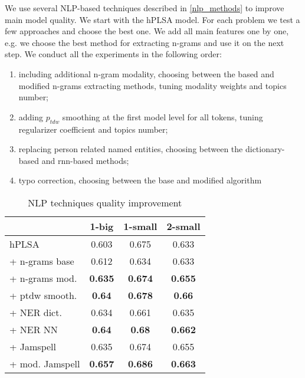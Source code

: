 
We use several NLP-based techniques described in \ref{nlp_methods} to improve main model quality.
We start with the hPLSA model.
For each problem we test a few approaches and choose the best one. 
We add all main features one by one, e.g. we choose the best method for extracting n-grams and use it on the next step.
We conduct all the experiments in the following order:
\begin{enumerate}
    \item including additional n-gram modality, choosing between the based and modified n-grams extracting methods, tuning modality weights and topics number;
    \item adding $p_{tdw}$ smoothing at the first model level for all tokens, tuning regularizer coefficient and topics number;
    \item replacing person related named entities, choosing between the dictionary-based and rnn-based methods;
    \item typo correction, choosing between the base and modified algorithm
\end{enumerate}

\begin{table}[!h]
    \centering
\begin{tabular}{p{2.7cm}|c|c|c}
    \hline
    & 1-big            & 1-small            & 2-small            \\ \hline
    hPLSA         & 0.603          & 0.675          & 0.633          \\
\hline \hline
    + n-grams base & 0.612 & 0.634 & 0.633 \\
    + n-grams mod. & \textbf{0.635} & \textbf{0.674} & \textbf{0.655} \\
\hline \hline
    + ptdw smooth. & \textbf{0.64} & \textbf{0.678} & \textbf{0.66} \\
\hline \hline
    + NER dict. & 0.634         & 0.661         & 0.635 \\
    + NER NN & \textbf{0.64} & \textbf{0.68} & \textbf{0.662} \\
\hline \hline
    + Jamspell  & {0.635} & {0.674} &  {0.655} \\  
    + mod. Jamspell & \textbf{0.657} & \textbf{0.686} & \textbf{0.663} \\  \hline 
\end{tabular}
    \caption{NLP techniques quality improvement}
    \label{nlp_techniques}
\end{table}


